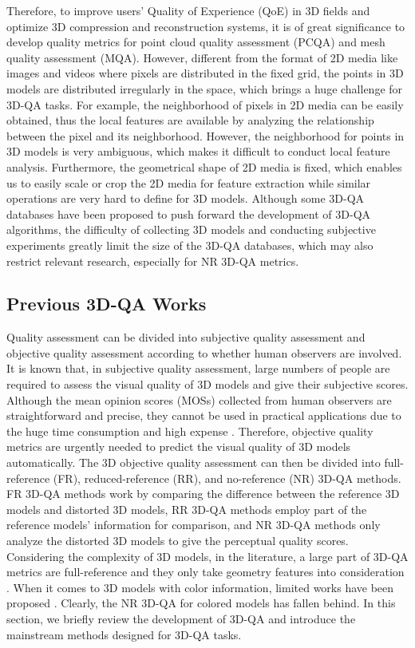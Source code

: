 \documentclass[lettersize,journal]{IEEEtran}
\begin{document}
Therefore, to improve users' Quality of Experience (QoE) in 3D fields and optimize 3D compression and reconstruction systems, it is of great significance to develop quality metrics for point cloud quality assessment (PCQA) and mesh quality assessment (MQA). However, different from the format of 2D media like images and videos where pixels are distributed in the fixed grid, the points in 3D models are distributed irregularly in the space, which brings a huge challenge for 3D-QA tasks. For example, the neighborhood of pixels in 2D media can be easily obtained, thus the local features are available by analyzing the relationship between the pixel and its neighborhood. However, the neighborhood for points in 3D models is very ambiguous, which makes it difficult to conduct local feature analysis. Furthermore, the geometrical shape of 2D media is fixed, which enables us to easily scale or crop the 2D media for feature extraction while similar operations are very hard to define for 3D models. Although some 3D-QA databases \cite{sjtu-pcqa} \cite{database} \cite{pcqa_database1} \cite{pcqa_database2} \cite{su2021perceptual} have been proposed to push forward the development of 3D-QA algorithms, the difficulty of collecting 3D models and conducting subjective experiments greatly limit the size of the 3D-QA databases, which may also restrict relevant research, especially for NR 3D-QA metrics. 

\subsection{Previous 3D-QA Works}
Quality assessment can be divided into subjective quality assessment and objective quality assessment according to whether human observers are involved. It is known that, in subjective quality assessment, large numbers of people are required to assess the visual quality of 3D models and give their subjective scores. Although the mean opinion scores (MOSs) collected from human observers are straightforward and precise, they cannot be used in practical applications due to the huge time consumption and high expense  \cite{sun2021blind}. Therefore, objective quality metrics are urgently needed to predict the visual quality of 3D models automatically. {The 3D objective quality assessment can then be divided into full-reference (FR), reduced-reference (RR), and no-reference (NR) 3D-QA methods. FR 3D-QA methods work by comparing the difference between the reference 3D models and distorted 3D models, RR 3D-QA methods employ part of the reference models' information for comparison, and NR 3D-QA methods only analyze the distorted 3D models to give the perceptual quality scores.} Considering the complexity of 3D models, in the literature, a large part of 3D-QA metrics are full-reference and they only take geometry features into consideration \cite{p2point, p2plane, m1,ff2_roughness, p2mesh,angular,pcqa2,dame}. When it comes to 3D models with color information, limited works have been proposed \cite{pcqa3,tian-color,guo-color,pcqm,liu2021reduced}. Clearly, the NR 3D-QA for colored models has fallen behind. In this section, we briefly review the development of 3D-QA and introduce the mainstream methods designed for 3D-QA tasks. 
\end{document}
